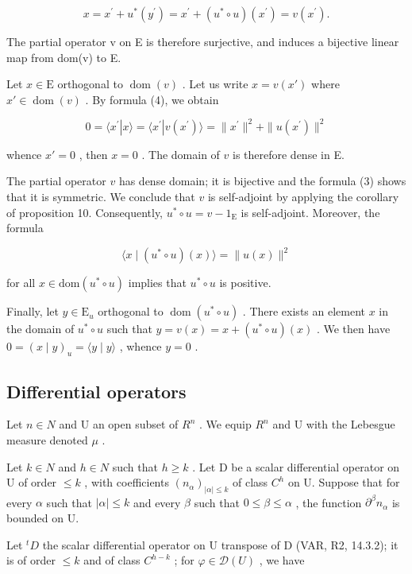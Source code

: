 \[
x = x ^ {\prime} + u ^ {*} (y ^ {\prime}) = x ^ {\prime} + (u ^ {*} \circ u) (x ^ {\prime}) = v (x ^ {\prime}).
\]

The partial operator v on E is therefore surjective, and induces a bijective linear map from dom(v) to E.

Let \(x \in \mathrm{E}\) orthogonal to \(\operatorname{dom}(v)\) . Let us write \(x = v(x')\) where \(x' \in \operatorname{dom}(v)\) . By formula (4), we obtain

\[
0 = \langle x ^ {\prime} | x \rangle = \langle x ^ {\prime} | v (x ^ {\prime}) \rangle = \| x ^ {\prime} \| ^ {2} + \| u (x ^ {\prime}) \| ^ {2}
\]

whence \(x' = 0\) , then \(x = 0\) . The domain of \(v\) is therefore dense in E.

The partial operator \(v\) has dense domain; it is bijective and the formula (3) shows that it is symmetric. We conclude that \(v\) is self-adjoint by applying the corollary of proposition 10. Consequently, \(u^{*} \circ u = v - 1_{\mathrm{E}}\) is self-adjoint. Moreover, the formula

\[
\langle x \mid (u ^ {*} \circ u) (x) \rangle = \| u (x) \| ^ {2}
\]

for all \(x \in \text{dom}(u^{*} \circ u)\) implies that \(u^{*} \circ u\) is positive.

Finally, let \(y \in \mathrm{E}_u\) orthogonal to \(\operatorname{dom}(u^* \circ u)\) . There exists an element \(x\) in the domain of \(u^* \circ u\) such that \(y = v(x) = x + (u^* \circ u)(x)\) . We then have \(0 = (x \mid y)_u = \langle y \mid y \rangle\) , whence \(y = 0\) .

\subsection{Differential operators}

Let \(n \in N\) and U an open subset of \(R^{n}\) . We equip \(R^{n}\) and U with the Lebesgue measure denoted \(\mu\) .

Let \(k \in N\) and \(h \in N\) such that \(h \geqslant k\) . Let D be a scalar differential operator on U of order \(\leqslant k\) , with coefficients \((n_{\alpha})_{|\alpha| \leqslant k}\) of class \(C^{h}\) on U. Suppose that for every \(\alpha\) such that \(|\alpha| \leqslant k\) and every \(\beta\) such that \(0 \leqslant \beta \leqslant \alpha\) , the function \(\partial^{\beta} n_{\alpha}\) is bounded on U.

Let \({}^{t}D\) the scalar differential operator on U transpose of D (VAR, R2, 14.3.2); it is of order \(\leqslant k\) and of class \(C^{h-k}\) ; for \(\varphi\in\mathcal{D}(U)\) , we have

